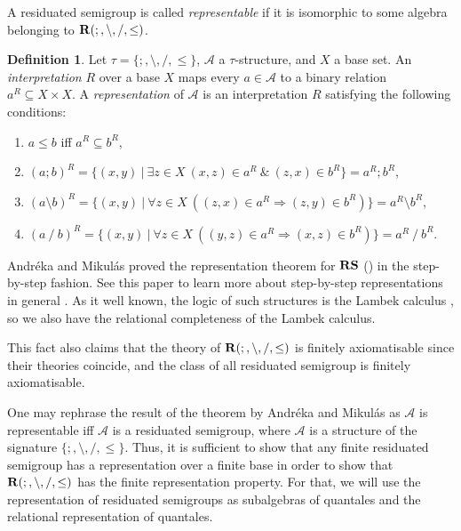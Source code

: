 \documentclass[a4paper]{article}
\theoremstyle{definition}
\newtheorem{definition}{Definition}
\theoremstyle{theorem}
\theoremstyle{proposition}
\theoremstyle{lemma}
\theoremstyle{ex}
\theoremstyle{corollary}
\theoremstyle{claim}
\begin{document}
A residuated semigroup is called \emph{representable} if it is isomorphic to some algebra belonging to ${\bf R}(;, \setminus, /, \leq)$.

\begin{definition}
  Let $\tau = \{ ;, \setminus, /, \leq \}$, $\mathcal{A}$ a $\tau$-structure, and $X$ a base set. An \emph{interpretation} $R$ over a base $X$ maps every $a \in \mathcal{A}$ to a binary relation $a^R \subseteq X \times X$. A \emph{representation} of $\mathcal{A}$ is an interpretation $R$ satisfying the following conditions:

  \begin{enumerate}
    \item $a \leq b$ iff $a^R \subseteq b^R$,
    \item $(a;b)^R = \{ (x, y) \: | \: \exists z \in X \: (x, z) \in a^R \: \& \: (z, x) \in b^R \} = a^R ; b^R$,
    \item $(a \setminus b)^{R} = \{ (x, y) \: | \: \forall z \in X \: ((z, x) \in a^R \Rightarrow (z, y) \in b^R)\} = a^R \setminus b^R$,
    \item $(a \: / \: b)^{R} = \{ (x, y) \: | \: \forall z \in X \: ((y, z) \in a^R \Rightarrow (x, z) \in b^R)\} = a^R \: / \: b^R$.
  \end{enumerate}
\end{definition}

 Andr\'{e}ka and Mikul\'{a}s proved the representation theorem for ${\bf RS}$ (\cite{andreka1994lambek}) in the step-by-step fashion. See this paper to learn more about step-by-step representations in general \cite{hirsch1997step}. As it well known, the logic of such structures is the Lambek calculus \cite{lambek1958mathematics}, so we also have the relational completeness of the Lambek calculus.

This fact also claims that the theory of ${\bf R}(;, \setminus, /, \leq)$ is finitely axiomatisable since their theories coincide, and the class of all residuated semigroup is finitely axiomatisable.

One may rephrase the result of the theorem by Andr\'{e}ka and Mikul\'{a}s as $\mathcal{A}$ is representable iff $\mathcal{A}$ is a residuated semigroup, where $\mathcal{A}$ is a structure of the signature $\{ ;, \setminus, /, \leq \}$. Thus, it is sufficient to show that any finite residuated semigroup has a representation over a finite base in order to show that ${\bf R}(;, \setminus, /, \leq)$ has the finite representation property. For that, we will use the representation of residuated
semigroups as subalgebras of quantales and the relational representation of quantales.
\end{document}
